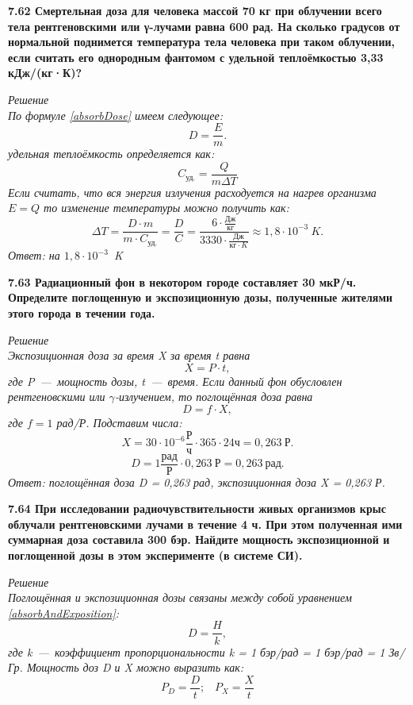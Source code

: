 \documentclass[a4paper, fontsize=14pt]{extreport}
\begin{document}
{\textbf{7.62 Смертельная доза для человека массой 70 кг при облучении всего тела рентгеновскими или γ-лучами равна 600 рад. На сколько градусов от нормальной поднимется температура тела человека при таком облучении, если считать его однородным фантомом с удельной теплоёмкостью 3,33 кДж/(кг·К)?}

\textit{Решение \\
%
По формуле \ref{absorbDose} имеем следующее:
\begin{equation}
  D = \frac{E }{m}.
\end{equation}
удельная теплоёмкость определяется как:
\begin{equation}
  C_\text{уд.} = \frac{Q}{m\Delta T} 
\end{equation}
Если считать, что вся энергия излучения расходуется на нагрев организма $E = Q$ то изменение температуры можно получить как:
\begin{equation}
  \Delta T = \frac{D\cdot m}{m \cdot C_\text{уд.}} = \frac{D}{C} = \frac{6\cdot \frac{\text{Дж}}{\text{кг}}}{3330 \cdot \frac{\text{Дж}}{\text{кг} \cdot K}} \approx 1,8 \cdot 10^{-3}\: K.  
\end{equation}
Ответ: на  $1,8 \cdot 10^{-3}$~K 
}

\textbf{7.63 Радиационный фон в некотором городе составляет 30 мкР/ч. Определите поглощенную и экспозиционную дозы, полученные жителями этого города в течении года.}

\textit{Решение \\
Экспозиционная доза за время X за время t равна 
\begin{equation}
  X = P \cdot t, 
\end{equation}
где P~---~мощность дозы, t~---~время. Если данный фон обусловлен рентгеновскими или $\gamma$-излучением, то поглощённая доза равна 
\[ D = f \cdot X ,\]
где $f = 1 $ рад/Р. Подставим числа:
\[ X = 30 \cdot 10^{-6} \frac{\text{Р}}{\text{ч}} \cdot 365 \cdot 24\text{ч} = 0,263 \: \text{Р}.
\]
\[ D = 1\frac{\text{рад}}{\text{Р}} \cdot 0,263 \: \text{Р} = 0,263 \: \text{рад}.
\]
Ответ: поглощённая доза D = 0,263 рад, экспозиционная доза X = 0,263 Р.
}

\textbf{7.64 При исследовании радиочувствительности живых организмов крыс облучали рентгеновскими лучами в течение 4 ч. При этом полученная ими суммарная доза составила 300 бэр. Найдите мощность экспозиционной и поглощенной дозы в этом эксперименте (в системе СИ).}

\textit{Решение \\
%
Поглощённая и экспозиционная дозы связаны между собой уравнением \ref{absorbAndExposition}:
\begin{equation}
  D = \frac{H}{k},
\end{equation}
где k~---~коэффициент пропорциональности k = 1 бэр/рад = 1 бэр/рад = 1 Зв/Гр.
Мощность доз D и X можно выразить как:
\begin{equation}
  P_D = \frac{D}{t}; \;\;\; P_X = \frac{X}{t} 
\end{equation}  
}

}
\end{document}
